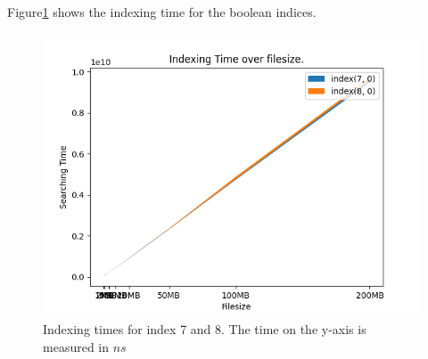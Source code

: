 Figure\ref{fig:IndexingBool} shows the indexing time for the boolean indices.

\begin{figure}[ht!]
    \centering
    \includegraphics[width=.8\textwidth]{LaTeX/Pictures/Results/Indexing[(7, 0), (8, 0)].png}
    \caption{Indexing times for index 7 and 8. The time on the y-axis is measured in $ns$}
    \label{fig:IndexingBool}
\end{figure}